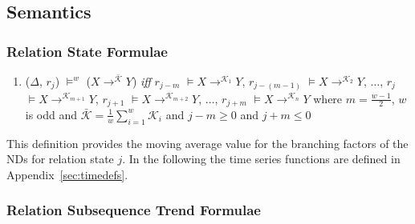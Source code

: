 \subsection{Semantics}


\subsubsection{Relation State Formulae}
\begin{enumerate}


\item\label{item:ma} ($\Delta$, $r_j$) $\models^w$ ($X
\to^{\bar{\mathcal{K}}} Y$) { \em iff } $r_{j-m}$
$\models X \to^{\mathcal{K}_1} Y$,  $r_{j-(m-1)}$
$\models X \to^{\mathcal{K}_2} Y$, $\ldots$,  $r_{j}$
$\models X \to^{\mathcal{K}_{m+1}} Y$,  $r_{j+1}$ 
$\models X \to^{\mathcal{K}_{m+2}} Y$, $\ldots$,  $r_{j+m}$
$\models X \to^{\mathcal{K}_n} Y$ where $m = \frac{w-1}{2}$, $w$ is odd
and $\bar{\mathcal{K}} = \frac{1}{w} \sum_{i = 1}^{w} \mathcal{K}_i$
and $j - m \ge 0$ and $j + m \le 0$

\end{enumerate}

This definition provides the moving average value for the branching
factors of the NDs for relation state $j$. In the following the time
series functions are defined in Appendix~\ref{sec:timedefs}.

\subsubsection{Relation Subsequence Trend Formulae}

